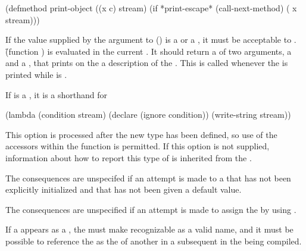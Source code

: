 \code
 (defmethod print-object ((x c) stream)
   (if *print-escape* (call-next-method) ( x stream)))
\endcode
 
     If the value supplied by the argument to  ()
is a  or a , 
it must be acceptable to 
     . \f{(function )} 
is evaluated
     in the current .  
It should return a  
of two
     arguments, a  and a , 
that prints on the  a
     description of the . 
 This  is called whenever the
      is printed while  is \nil.

If  is a , it is a shorthand for 

\code
 (lambda (condition stream)
   (declare (ignore condition))
   (write-string  stream))
\endcode

This option is processed after the new  type has been defined,
so use of the  accessors within the  function is permitted.
If this option is not supplied, information about how to report this
type of  is inherited from the .

\endlist

The consequences are unspecifed if an attempt is made to  a 
 that has not been explicitly initialized and that has not 
been given a default value.

The consequences are unspecified if an attempt is made to assign the
 by using .

If a   appears as a ,
the  must make  recognizable as a valid  name,
and it must be possible to reference the   as the
 of another   in a subsequent
  in the  being compiled.

